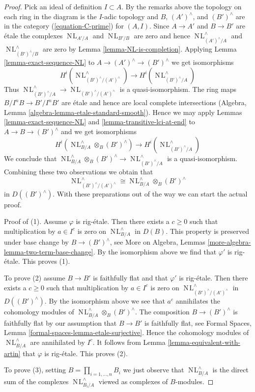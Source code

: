 \documentclass[10pt,a4paper]{amsart}
\theoremstyle{plain}
\theoremstyle{definition}
\theoremstyle{remark}
\numberwithin{equation}{subsection}
\def\NL{\mathop{N\!L}\nolimits}
\begin{document}
\begin{proof}
\medskip\noindent
Pick an ideal of definition $I \subset A$. By the remarks above
the topology on each ring in the diagram is the $I$-adic topology
and $B$, $(A')^\wedge$, and $(B')^\wedge$ are in the category
(\ref{equation-C-prime}) for $(A, I)$.
Since $A \to A'$ and $B \to B'$ are \'etale the complexes
$\NL_{A'/A}$ and $\NL_{B'/B}$ are zero and hence
$\NL_{(A')^\wedge/A}^\wedge$ and $\NL_{(B')^\wedge/B}^\wedge$
are zero by Lemma \ref{lemma-NL-is-completion}.
Applying Lemma \ref{lemma-exact-sequence-NL} to
$A \to (A')^\wedge \to (B')^\wedge$ we get isomorphisms
$$
H^i(\NL_{(B')^\wedge/(A')^\wedge}^\wedge) \to H^i(\NL_{(B')^\wedge/A}^\wedge)
$$
Thus $\NL_{(B')^\wedge/A}^\wedge \to \NL_{(B')^\wedge/(A')^\wedge}$
is a quasi-isomorphism. The ring maps $B/I^nB \to B'/I^nB'$ are \'etale
and hence are local complete intersections
(Algebra, Lemma \ref{algebra-lemma-etale-standard-smooth}).
Hence we may apply
Lemmas \ref{lemma-exact-sequence-NL} and
\ref{lemma-transitive-lci-at-end} to
$A \to B \to (B')^\wedge$ and we get isomorphisms
$$
H^i(\NL_{B/A}^\wedge \otimes_B (B')^\wedge) \to
H^i(\NL_{(B')^\wedge/A}^\wedge)
$$
We conclude that
$\NL_{B/A}^\wedge \otimes_B (B')^\wedge \to \NL_{(B')^\wedge/A}^\wedge$
is a quasi-isomorphism. Combining these two observations we obtain that
$$
\NL_{(B')^\wedge/(A')^\wedge}^\wedge \cong
\NL_{B/A}^\wedge \otimes_B (B')^\wedge
$$
in $D((B')^\wedge)$.
With these preparations out of the way we can start the actual proof.

\medskip\noindent
Proof of (1). Assume $\varphi$ is rig-\'etale. Then there exists a $c \geq 0$
such that multiplication by $a \in I^c$ is zero on $\NL_{B/A}^\wedge$
in $D(B)$. This property is preserved under base change
by $B \to (B')^\wedge$, see
More on Algebra, Lemmas \ref{more-algebra-lemma-two-term-base-change}.
By the isomorphism above we find that $\varphi'$ is rig-\'etale.
This proves (1).

\medskip\noindent
To prove (2) assume $B \to B'$ is faithfully flat and that $\varphi'$
is rig-\'etale. Then there exists a $c \geq 0$ such that
multiplication by $a \in I^c$ is zero on
$\NL_{(B')^\wedge/(A')^\wedge}^\wedge$ in $D((B')^\wedge)$.
By the isomorphism above we see that $a^c$ annihilates the
cohomology modules of
$\NL_{B/A}^\wedge \otimes_B (B')^\wedge$.
The composition $B \to (B')^\wedge$ is faithfully flat
by our assumption that $B \to B'$ is faithfully flat, see
Formal Spaces, Lemma \ref{formal-spaces-lemma-etale-surjective}.
Hence the cohomology modules of $\NL_{B/A}^\wedge$ are annihilated
by $I^c$. It follows from Lemma \ref{lemma-equivalent-with-artin}
that $\varphi$ is rig-\'etale.
This proves (2).

\medskip\noindent
To prove (3), setting $B = \prod_{i = 1, \ldots, n} B_i$
we just observe that $\NL_{B/A}^\wedge$ is the direct
sum of the complexes $\NL_{B_i/A}^\wedge$ viewed as complexes
of $B$-modules.
\end{proof}
\end{document}
